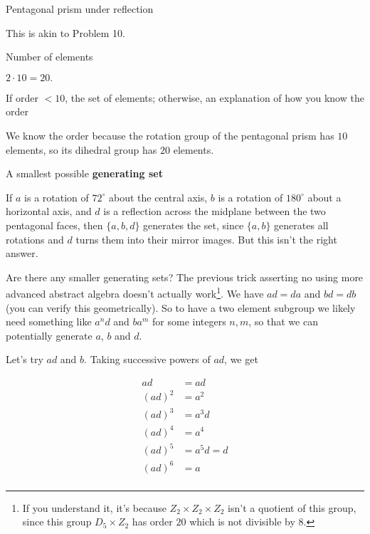 \documentclass[../gatm_answers.tex]{subfiles}
\begin{document}
\begin{outer_problem}
\item Pentagonal prism under reflection
\end{outer_problem}

This is akin to Problem 10.

\begin{inner_problem}[start=1]
\item Number of elements
\end{inner_problem}

$2\cdot 10=20.$

\begin{inner_problem}
\item If order $< 10$, the set of elements; otherwise, an explanation of how you know the order
\end{inner_problem}

We know the order because the rotation group of the pentagonal prism has $10$ elements, so its dihedral group has $20$ elements.

\begin{inner_problem}
\item A smallest possible \textbf{generating set}
\end{inner_problem}

If $a$ is a rotation of $72^\circ$ about the central axis, $b$ is a rotation of $180^\circ$ about a horizontal axis, and $d$ is a reflection across the midplane between the two pentagonal faces, then $\{a,b,d\}$ generates the set, since $\{a,b\}$ generates all rotations and $d$ turns them into their mirror images. But this isn't the right answer.

Are there any smaller generating sets? The previous trick asserting no using more advanced abstract algebra doesn't actually work\footnote{If you understand it, it's because $Z_2\times Z_2\times Z_2$ isn't a quotient of this group, since this group $D_5 \times Z_2$ has order $20$ which is not divisible by $8$.}. We have $ad=da$ and $bd=db$ (you can verify this geometrically). So to have a two element subgroup we likely need something like $a^nd$ and $ba^m$ for some integers $n,m$, so that we can potentially generate $a$, $b$ and $d$.

Let's try $ad$ and $b$. Taking successive powers of $ad$, we get

\begin{align*}
ad &= ad \\
(ad)^2 &= a^2 \\
(ad)^3 &= a^3d \\
(ad)^4 &= a^4 \\
(ad)^5 &= a^5d = d \\
(ad)^6 &= a \\
\end{align*}
\end{document}
